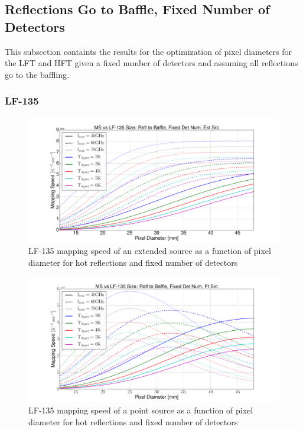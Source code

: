 \documentclass[12pt, titlepage]{article} %
\begin{document}

\subsection{Reflections Go to Baffle, Fixed Number of Detectors}

This subsection containts the results for the optimization of pixel diameters for the LFT and HFT given a fixed number of detectors and assuming all reflections go to the baffling.

\clearpage


\subsubsection{LF-135}

\begin{figure}[H]
	\centering
	\includegraphics[width=1.1\textwidth, center]{PDF/LFT_MS_LF-135_hotRefl_fixDetNum_extSrc.pdf}
	\caption{LF-135 mapping speed of an extended source as a function of pixel diameter for hot reflections and fixed number of detectors}
\end{figure}

\begin{figure}[H]
	\centering
	\includegraphics[width=1.1\textwidth, center]{PDF/LFT_MS_LF-135_hotRefl_fixDetNum_ptSrc.pdf}
	\caption{LF-135 mapping speed of a point source as a function of pixel diameter for hot reflections and fixed number of detectors}
\end{figure}
\end{document}
